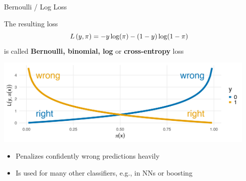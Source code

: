 \documentclass[11pt,compress,t,notes=noshow, xcolor=table]{beamer}
\begin{document}
\begin{vbframe}{Bernoulli / Log Loss}

The resulting loss 
$$L\left(y, \pi\right) = -y\log(\pi)-(1-y)\log(1-\pi)$$ 
is called \textbf{Bernoulli, binomial, log} or \textbf{cross-entropy} loss

\lz

{\centering \includegraphics[width=0.95\textwidth]{figure/log_loss.png}
}

\lz

\begin{itemize}
  \item Penalizes confidently wrong predictions heavily
  \item Is used for many other classifiers, e.g., in NNs or boosting 


  
\end{itemize}


\end{vbframe}
\end{document}
